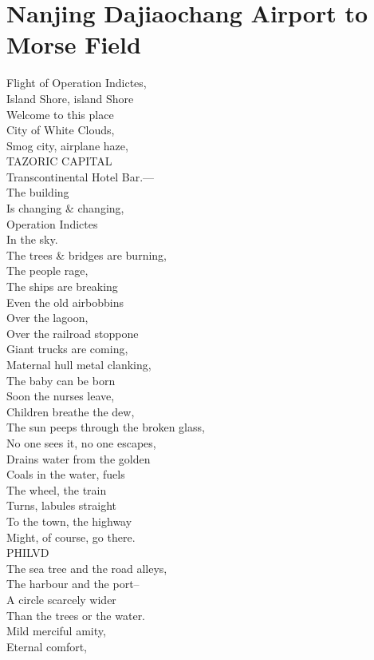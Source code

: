 \documentclass[smalldemyvopaper,11pt,twoside,onecolumn,openright,extrafontsizes]{memoir}
\begin{document}
\chapter{Nanjing Dajiaochang Airport to Morse Field}
Flight of Operation Indictes,
\\Island Shore, island Shore
\\Welcome to this place
\\City of White Clouds,
\\Smog city, airplane haze,
\\TAZORIC CAPITAL
\\Transcontinental Hotel Bar.—
\\The building
\\Is changing \& changing,
\\Operation Indictes
\\In the sky.
\\The trees \& bridges are burning,
\\The people rage,
\\The ships are breaking
\\Even the old airbobbins
\\Over the lagoon,
\\Over the railroad stoppone
\\Giant trucks are coming,
\\Maternal hull metal clanking,
\\The baby can be born
\\Soon the nurses leave,
\\Children breathe the dew,
\\The sun peeps through the broken glass,
\\No one sees it, no one escapes,
\\Drains water from the golden
\\Coals in the water, fuels
\\The wheel, the train
\\Turns, labules straight
\\To the town, the highway
\\Might, of course, go there.
\\PHILVD
\\The sea tree and the road alleys,
\\The harbour and the port--
\\A circle scarcely wider
\\Than the trees or the water.
\\Mild merciful amity,
\\Eternal comfort,
\end{document}

